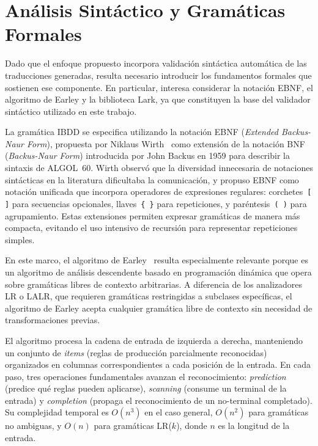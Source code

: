 \section{Análisis Sintáctico y Gramáticas Formales}
\label{sec:gramaticas-formales}

Dado que el enfoque propuesto incorpora validación sintáctica automática de las traducciones generadas, resulta necesario introducir los fundamentos formales que sostienen ese componente. En particular, interesa considerar la notación EBNF, el algoritmo de Earley y la biblioteca Lark, ya que constituyen la base del validador sintáctico utilizado en este trabajo.

La gramática IBDD se especifica utilizando la notación EBNF (\textit{Extended Backus-Naur Form}), propuesta por Niklaus Wirth~\cite{wirth1977ebnf} como extensión de la notación BNF (\textit{Backus-Naur Form}) introducida por John Backus en 1959 para describir la sintaxis de ALGOL~60. Wirth observó que la diversidad innecesaria de notaciones sintácticas en la literatura dificultaba la comunicación, y propuso EBNF como notación unificada que incorpora operadores de expresiones regulares: corchetes~\texttt{[ ]} para secuencias opcionales, llaves~\verb|{ }| para repeticiones, y paréntesis~\texttt{( )} para agrupamiento. Estas extensiones permiten expresar gramáticas de manera más compacta, evitando el uso intensivo de recursión para representar repeticiones simples.

En este marco, el algoritmo de Earley~\cite{earley1970parsing} resulta especialmente relevante porque es un algoritmo de análisis descendente basado en programación dinámica que opera sobre gramáticas libres de contexto arbitrarias. A diferencia de los analizadores LR o LALR, que requieren gramáticas restringidas a subclases específicas, el algoritmo de Earley acepta cualquier gramática libre de contexto sin necesidad de transformaciones previas.

El algoritmo procesa la cadena de entrada de izquierda a derecha, manteniendo un conjunto de \textit{items} (reglas de producción parcialmente reconocidas) organizados en columnas correspondientes a cada posición de la entrada. En cada paso, tres operaciones fundamentales avanzan el reconocimiento: \textit{prediction} (predice qué reglas pueden aplicarse), \textit{scanning} (consume un terminal de la entrada) y \textit{completion} (propaga el reconocimiento de un no-terminal completado). Su complejidad temporal es $O(n^3)$ en el caso general, $O(n^2)$ para gramáticas no ambiguas, y $O(n)$ para gramáticas LR($k$), donde $n$ es la longitud de la entrada.

